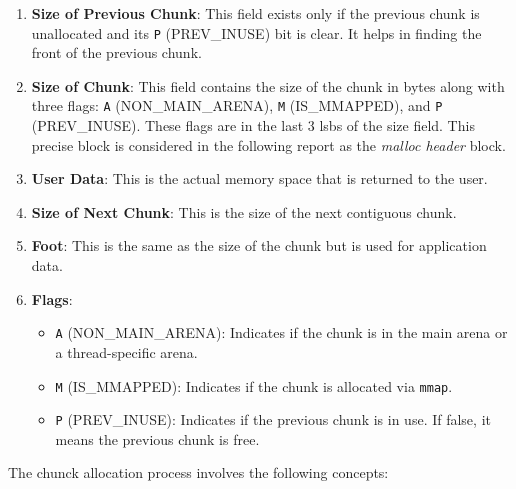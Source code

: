     \begin{enumerate}
        \item \textbf{Size of Previous Chunk}: This field exists only if the previous chunk is unallocated and its \texttt{P} (PREV\_INUSE) bit is clear. It helps in finding the front of the previous chunk.
        
        \item \textbf{Size of Chunk}: This field contains the size of the chunk in bytes along with three flags: \texttt{A} (NON\_MAIN\_ARENA), \texttt{M} (IS\_MMAPPED), and \texttt{P} (PREV\_INUSE). These flags are in the last 3 \acrshort{lsb}s of the size field. This precise block is considered in the following report as the \textit{malloc header} block.
        
        \item \textbf{User Data}: This is the actual memory space that is returned to the user.
        
        \item \textbf{Size of Next Chunk}: This is the size of the next contiguous chunk.
        
        \item \textbf{Foot}: This is the same as the size of the chunk but is used for application data.
        
        \item \textbf{Flags}:
        \begin{itemize}
            \item \texttt{A} (NON\_MAIN\_ARENA): Indicates if the chunk is in the main arena or a thread-specific arena.
            \item \texttt{M} (IS\_MMAPPED): Indicates if the chunk is allocated via \texttt{mmap}.
            \item \texttt{P} (PREV\_INUSE): Indicates if the previous chunk is in use. If false, it means the previous chunk is free.
        \end{itemize}
    \end{enumerate}

    The chunck allocation process involves the following concepts: 

